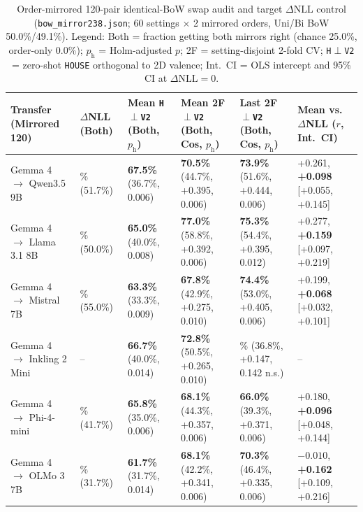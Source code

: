 \documentclass[conference]{IEEEtran}
\begin{document}
\begin{table}[t]
\centering
\caption{Order-mirrored 120-pair identical-BoW swap audit and target $\Delta\text{NLL}$ control (\texttt{bow\_mirror238.json}; 60 settings $\times$ 2 mirrored orders, Uni/Bi BoW 50.0\%/49.1\%). Legend: Both = fraction getting both mirrors right (chance 25.0\%, order-only 0.0\%); $p_{\text{h}}$ = Holm-adjusted $p$; 2F = setting-disjoint 2-fold CV; \texttt{H}$\perp$\texttt{V2} = zero-shot \texttt{HOUSE} orthogonal to 2D valence; Int.\ CI = OLS intercept and 95\% CI at $\Delta\text{NLL}=0$.}
\label{tab:bmirror}
\scriptsize
\setlength{\tabcolsep}{2.0pt}
\begin{tabular}{@{}l>{\centering\arraybackslash}p{1.65cm}>{\centering\arraybackslash}p{2.50cm}>{\centering\arraybackslash}p{3.20cm}>{\centering\arraybackslash}p{3.20cm}>{\centering\arraybackslash}p{2.90cm}@{}}
\toprule
\textbf{Transfer (Mirrored 120)} & \textbf{$\Delta$NLL (Both)} & \textbf{Mean \texttt{H}$\perp$\texttt{V2} (Both, $p_{\text{h}}$)} & \textbf{Mean 2F $\perp$\texttt{V2} (Both, Cos, $p_{\text{h}}$)} & \textbf{Last 2F $\perp$\texttt{V2} (Both, Cos, $p_{\text{h}}$)} & \textbf{Mean vs.\ $\Delta$NLL ($r$, Int.\ CI)} \\
\midrule
Gemma 4 $\to$ Qwen3.5 9B & 71.7\% (51.7\%) & \textbf{67.5\%} (36.7\%, 0.006) & \textbf{70.5\%} (44.7\%, +0.395, 0.006) & \textbf{73.9\%} (51.6\%, +0.444, 0.006) & +0.261, \textbf{+0.098} [+0.055, +0.145] \\
Gemma 4 $\to$ Llama 3.1 8B & 70.8\% (50.0\%) & \textbf{65.0\%} (40.0\%, 0.008) & \textbf{77.0\%} (58.8\%, +0.392, 0.006) & \textbf{75.3\%} (54.4\%, +0.395, 0.012) & +0.277, \textbf{+0.159} [+0.097, +0.219] \\
Gemma 4 $\to$ Mistral 7B & 72.5\% (55.0\%) & \textbf{63.3\%} (33.3\%, 0.009) & \textbf{67.8\%} (42.9\%, +0.275, 0.010) & \textbf{74.4\%} (53.0\%, +0.405, 0.006) & +0.199, \textbf{+0.068} [+0.032, +0.101] \\
Gemma 4 $\to$ Inkling 2 Mini & -- & \textbf{66.7\%} (40.0\%, 0.014) & \textbf{72.8\%} (50.5\%, +0.265, 0.010) & 60.5\% (36.8\%, +0.147, 0.142 n.s.) & -- \\
Gemma 4 $\to$ Phi-4-mini & 66.7\% (41.7\%) & \textbf{65.8\%} (35.0\%, 0.006) & \textbf{68.1\%} (44.3\%, +0.357, 0.006) & \textbf{66.0\%} (39.3\%, +0.371, 0.006) & +0.180, \textbf{+0.096} [+0.048, +0.144] \\
Gemma 4 $\to$ OLMo 3 7B & 60.8\% (31.7\%) & \textbf{61.7\%} (31.7\%, 0.014) & \textbf{68.1\%} (42.2\%, +0.341, 0.006) & \textbf{70.3\%} (46.4\%, +0.335, 0.006) & $-0.010$, \textbf{+0.162} [+0.109, +0.216] \\
\bottomrule
\end{tabular}
\end{table}
\end{document}
